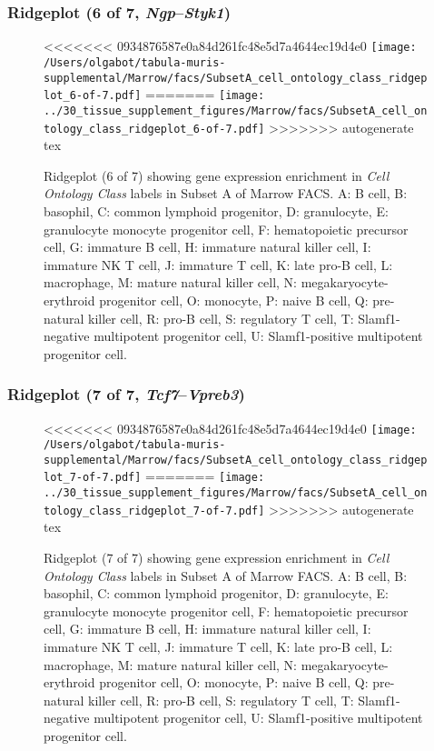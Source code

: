 \clearpage

\subsubsection{Ridgeplot (6 of 7, \emph{Ngp}--\emph{Styk1})}
\begin{figure}[h]
\centering
<<<<<<< 0934876587e0a84d261fc48e5d7a4644ec19d4e0
\texttt{[image: /Users/olgabot/tabula-muris-supplemental/Marrow/facs/SubsetA\_cell\_ontology\_class\_ridgeplot\_6-of-7.pdf]}
=======
\texttt{[image: ../30\_tissue\_supplement\_figures/Marrow/facs/SubsetA\_cell\_ontology\_class\_ridgeplot\_6-of-7.pdf]}
>>>>>>> autogenerate tex

\caption{ Ridgeplot (6 of 7)  showing gene expression enrichment in \emph{Cell Ontology Class} labels in Subset A of Marrow FACS. A: B cell, B: basophil, C: common lymphoid progenitor, D: granulocyte, E: granulocyte monocyte progenitor cell, F: hematopoietic precursor cell, G: immature B cell, H: immature natural killer cell, I: immature NK T cell, J: immature T cell, K: late pro-B cell, L: macrophage, M: mature natural killer cell, N: megakaryocyte-erythroid progenitor cell, O: monocyte, P: naive B cell, Q: pre-natural killer cell, R: pro-B cell, S: regulatory T cell, T: Slamf1-negative multipotent progenitor cell, U: Slamf1-positive multipotent progenitor cell.}
\end{figure}


\clearpage

\subsubsection{Ridgeplot (7 of 7, \emph{Tcf7}--\emph{Vpreb3})}
\begin{figure}[h]
\centering
<<<<<<< 0934876587e0a84d261fc48e5d7a4644ec19d4e0
\texttt{[image: /Users/olgabot/tabula-muris-supplemental/Marrow/facs/SubsetA\_cell\_ontology\_class\_ridgeplot\_7-of-7.pdf]}
=======
\texttt{[image: ../30\_tissue\_supplement\_figures/Marrow/facs/SubsetA\_cell\_ontology\_class\_ridgeplot\_7-of-7.pdf]}
>>>>>>> autogenerate tex

\caption{ Ridgeplot (7 of 7)  showing gene expression enrichment in \emph{Cell Ontology Class} labels in Subset A of Marrow FACS. A: B cell, B: basophil, C: common lymphoid progenitor, D: granulocyte, E: granulocyte monocyte progenitor cell, F: hematopoietic precursor cell, G: immature B cell, H: immature natural killer cell, I: immature NK T cell, J: immature T cell, K: late pro-B cell, L: macrophage, M: mature natural killer cell, N: megakaryocyte-erythroid progenitor cell, O: monocyte, P: naive B cell, Q: pre-natural killer cell, R: pro-B cell, S: regulatory T cell, T: Slamf1-negative multipotent progenitor cell, U: Slamf1-positive multipotent progenitor cell.}
\end{figure}


